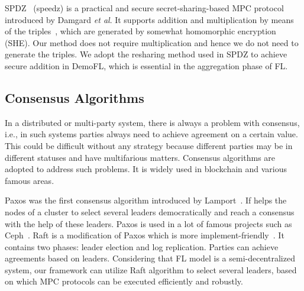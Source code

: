 SPDZ~\cite{SPDZ} (speedz) is a practical and secure secret-sharing-based MPC protocol introduced by Damgard \emph{et al}. It supports addition and multiplication by means of the triples~\cite{Triple}, which are generated by somewhat homomorphic encryption (SHE). Our method does not require multiplication and hence we do not need to generate the triples. We adopt the resharing method used in SPDZ to achieve secure addition in DemoFL, which is essential in the aggregation phase of FL.


\subsection{Consensus Algorithms}
In a distributed or multi-party system, there is always a problem with consensus, i.e., in such systems parties always need to achieve agreement on a certain value. This could be difficult without any strategy because different parties may be in different statuses and have multifarious matters. Consensus algorithms are adopted to address such problems. It is widely used in blockchain and various famous areas.

Paxos was the first consensus algorithm introduced by Lamport~\cite{Paxos}. If helps the nodes of a cluster to select several leaders democratically and reach a consensus with the help of these leaders. Paxos is used in a lot of famous projects such as Ceph~\cite{Ceph}. Raft is a modification of Paxos which is more implement-friendly~\cite{Raft}. It contains two phases: leader election and log replication. Parties can achieve agreements based on leaders. Considering that FL model is a semi-decentralized system, our framework can utilize Raft algorithm to select several leaders, based on which MPC protocols can be executed efficiently and robustly.
